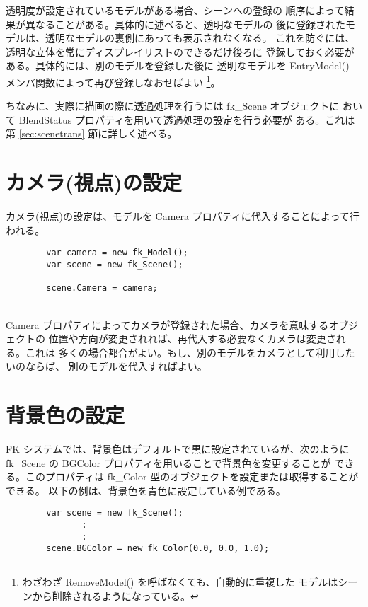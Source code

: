 透明度が設定されているモデルがある場合、シーンへの登録の
順序によって結果が異なることがある。具体的に述べると、透明なモデルの
後に登録されたモデルは、透明なモデルの裏側にあっても表示されなくなる。
これを防ぐには、透明な立体を常にディスプレイリストのできるだけ後ろに
登録しておく必要がある。具体的には、別のモデルを登録した後に
透明なモデルを EntryModel() メンバ関数によって再び登録しなおせばよい
\footnote{わざわざ RemoveModel() を呼ばなくても、自動的に重複した
モデルはシーンから削除されるようになっている。}。

ちなみに、実際に描画の際に透過処理を行うには fk\_Scene オブジェクトに
おいて BlendStatus プロパティを用いて透過処理の設定を行う必要が
ある。これは第 \ref{sec:scenetrans} 節に詳しく述べる。

\section{カメラ(視点)の設定} \label{sec:scenecamera}
カメラ(視点)の設定は、モデルを Camera プロパティに代入することによって行われる。
\\
\begin{breakbox}
\begin{verbatim}
        var camera = new fk_Model();
        var scene = new fk_Scene();

        scene.Camera = camera;
\end{verbatim}
\end{breakbox}
~ \\
Camera プロパティによってカメラが登録された場合、カメラを意味するオブジェクトの
位置や方向が変更されれば、再代入する必要なくカメラは変更される。これは
多くの場合都合がよい。もし、別のモデルをカメラとして利用したいのならば、
別のモデルを代入すればよい。

\section{背景色の設定} \label{sec:scenebg}
FK システムでは、背景色はデフォルトで黒に設定されているが、次のように
fk\_Scene の BGColor プロパティを用いることで背景色を変更することが
できる。このプロパティは fk\_Color 型のオブジェクトを設定または取得することができる。
以下の例は、背景色を青色に設定している例である。
\\
\begin{breakbox}
\begin{verbatim}
        var scene = new fk_Scene();
               :
               :
        scene.BGColor = new fk_Color(0.0, 0.0, 1.0);
\end{verbatim}
\end{breakbox}

